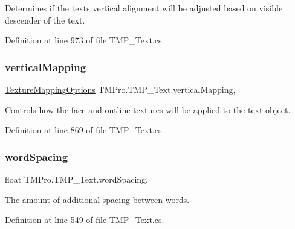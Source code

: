 Determines if the text\textquotesingle{}s vertical alignment will be adjusted based on visible descender of the text. 



Definition at line 973 of file T\+M\+P\+\_\+\+Text.\+cs.

\mbox{\label{class_t_m_pro_1_1_t_m_p___text_acd761b8efd2cdbd37d3d288d9609df94}} 
\subsubsection{\texorpdfstring{verticalMapping}{verticalMapping}}
{\footnotesize\ttfamily \mbox{\hyperlink{namespace_t_m_pro_ab5c7877e6f736cba8b501c877bf5b612}{Texture\+Mapping\+Options}} T\+M\+Pro.\+T\+M\+P\+\_\+\+Text.\+vertical\+Mapping\hspace{0.3cm}{\ttfamily [get]}, {\ttfamily [set]}}



Controls how the face and outline textures will be applied to the text object. 



Definition at line 869 of file T\+M\+P\+\_\+\+Text.\+cs.

\mbox{\label{class_t_m_pro_1_1_t_m_p___text_a89e9e5abbcf91abc49ba30c65a405456}} 
\subsubsection{\texorpdfstring{wordSpacing}{wordSpacing}}
{\footnotesize\ttfamily float T\+M\+Pro.\+T\+M\+P\+\_\+\+Text.\+word\+Spacing\hspace{0.3cm}{\ttfamily [get]}, {\ttfamily [set]}}



The amount of additional spacing between words. 



Definition at line 549 of file T\+M\+P\+\_\+\+Text.\+cs.

\mbox{\label{class_t_m_pro_1_1_t_m_p___text_a2b99cf7451acebb062bcdf48f8db8960}} 
